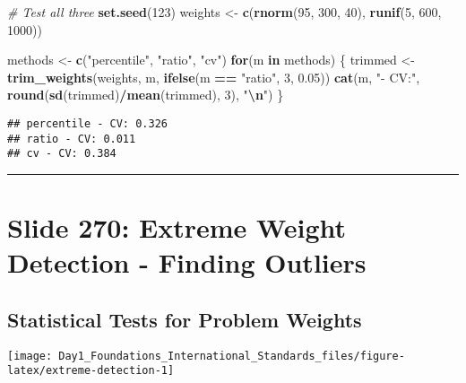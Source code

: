 \documentclass[
]{article}
\newenvironment{Shaded}{\begin{snugshade}}{\end{snugshade}}
\newcommand{\CommentTok}[1]{\textcolor[rgb]{0.56,0.35,0.01}{\textit{#1}}}
\newcommand{\ControlFlowTok}[1]{\textcolor[rgb]{0.13,0.29,0.53}{\textbf{#1}}}
\newcommand{\DecValTok}[1]{\textcolor[rgb]{0.00,0.00,0.81}{#1}}
\newcommand{\FloatTok}[1]{\textcolor[rgb]{0.00,0.00,0.81}{#1}}
\newcommand{\FunctionTok}[1]{\textcolor[rgb]{0.13,0.29,0.53}{\textbf{#1}}}
\newcommand{\NormalTok}[1]{#1}
\newcommand{\OtherTok}[1]{\textcolor[rgb]{0.56,0.35,0.01}{#1}}
\newcommand{\SpecialCharTok}[1]{\textcolor[rgb]{0.81,0.36,0.00}{\textbf{#1}}}
\newcommand{\StringTok}[1]{\textcolor[rgb]{0.31,0.60,0.02}{#1}}
\begin{document}
\begin{Shaded}
\begin{Highlighting}[]
\CommentTok{\# Test all three}
\FunctionTok{set.seed}\NormalTok{(}\DecValTok{123}\NormalTok{)}
\NormalTok{weights }\OtherTok{\textless{}{-}} \FunctionTok{c}\NormalTok{(}\FunctionTok{rnorm}\NormalTok{(}\DecValTok{95}\NormalTok{, }\DecValTok{300}\NormalTok{, }\DecValTok{40}\NormalTok{), }\FunctionTok{runif}\NormalTok{(}\DecValTok{5}\NormalTok{, }\DecValTok{600}\NormalTok{, }\DecValTok{1000}\NormalTok{))}

\NormalTok{methods }\OtherTok{\textless{}{-}} \FunctionTok{c}\NormalTok{(}\StringTok{"percentile"}\NormalTok{, }\StringTok{"ratio"}\NormalTok{, }\StringTok{"cv"}\NormalTok{)}
\ControlFlowTok{for}\NormalTok{(m }\ControlFlowTok{in}\NormalTok{ methods) \{}
\NormalTok{  trimmed }\OtherTok{\textless{}{-}} \FunctionTok{trim\_weights}\NormalTok{(weights, m, }\FunctionTok{ifelse}\NormalTok{(m }\SpecialCharTok{==} \StringTok{"ratio"}\NormalTok{, }\DecValTok{3}\NormalTok{, }\FloatTok{0.05}\NormalTok{))}
  \FunctionTok{cat}\NormalTok{(m, }\StringTok{"{-} CV:"}\NormalTok{, }\FunctionTok{round}\NormalTok{(}\FunctionTok{sd}\NormalTok{(trimmed)}\SpecialCharTok{/}\FunctionTok{mean}\NormalTok{(trimmed), }\DecValTok{3}\NormalTok{), }\StringTok{"}\SpecialCharTok{\textbackslash{}n}\StringTok{"}\NormalTok{)}
\NormalTok{\}}
\end{Highlighting}
\end{Shaded}

\begin{verbatim}
## percentile - CV: 0.326 
## ratio - CV: 0.011 
## cv - CV: 0.384
\end{verbatim}

\begin{center}\rule{0.5\linewidth}{0.5pt}\end{center}

\section{Slide 270: Extreme Weight Detection - Finding
Outliers}\label{slide-270-extreme-weight-detection---finding-outliers}

\subsection{Statistical Tests for Problem
Weights}\label{statistical-tests-for-problem-weights}

\texttt{[image: Day1\_Foundations\_International\_Standards\_files/figure-latex/extreme-detection-1]}
\end{document}
